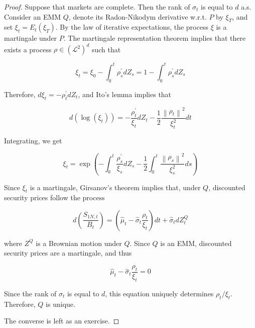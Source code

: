 \documentclass[\topdir/lecture\_notes.tex]{subfiles}
\begin{document}
\begin{proof}
Suppose that markets are complete. Then the rank of $\sigma_{t}$ is equal to $d$ a.s. Consider an EMM $Q$, denote its Radon-Nikodym derivative w.r.t. $P$ by $\xi_{T}$, and set $\xi_{t}=E_{t}\left(\xi_{T}\right)$. By the law of iterative expectations, the process $\xi$ is a martingale under $P$. The martingale representation theorem implies that there exists a process $\rho \in\left(\mathcal{L}^{2}\right)^{d}$ such that

\begin{equation}
\xi_{t}=\xi_{0}-\int_{0}^{t} \rho_{s}^{\prime} d Z_{s}=1-\int_{0}^{t} \rho_{s}^{\prime} d Z_{s} \label{eq:6.2.5}
\end{equation}

Therefore, $d \xi_{t}=-\rho_{t}^{\prime} d Z_{t}$, and Ito's lemma implies that

\begin{equation}
d\left(\log \left(\xi_{t}\right)\right)=-\frac{\rho_{t}^{\prime}}{\xi_{t}} d Z_{t}-\frac{1}{2} \frac{\left\|\rho_{t}\right\|^{2}}{\xi_{t}^{2}} d t
\end{equation}

Integrating, we get

\begin{equation}
\xi_{t}=\exp \left(-\int_{0}^{t} \frac{\rho_{s}^{\prime}}{\xi_{s}} d Z_{s}-\frac{1}{2} \int_{0}^{t} \frac{\left\|\rho_{s}\right\|^{2}}{\xi_{s}^{2}} d s\right)
\end{equation}

Since $\xi_{t}$ is a martingale, Girsanov's theorem implies that, under $Q$, discounted security prices follow the process

\begin{equation}
d\left(\frac{S_{1 N, t}}{B_{t}}\right)=\left(\hat{\mu}_{t}-\hat{\sigma}_{t} \frac{\rho_{t}}{\xi_{t}}\right) d t+\hat{\sigma}_{t} d Z_{t}^{Q}
\end{equation}

where $Z^{Q}$ is a Brownian motion under $Q$. Since $Q$ is an EMM, discounted security prices are a martingale, and thus

\begin{equation}
\hat{\mu}_{t}-\hat{\sigma}_{t} \frac{\rho_{t}}{\xi_{t}}=0
\end{equation}

Since the rank of $\sigma_{t}$ is equal to $d$, this equation uniquely determines $\rho_{t} / \xi_{t}$. Therefore, $Q$ is unique.

The converse is left as an exercise.
\end{proof}
\end{document}
